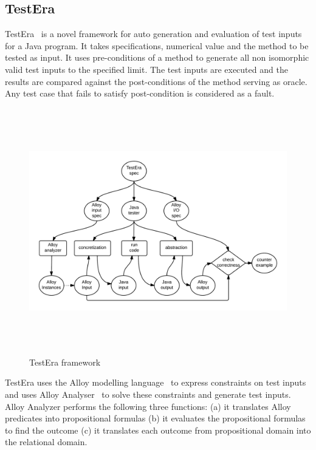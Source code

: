 \subsection{TestEra}
TestEra~\cite{marinov2001testera} is a novel framework for auto generation and evaluation of test inputs for a Java program. It takes specifications, numerical value and the method to be tested as input. It uses pre-conditions of a method to generate all non isomorphic valid test inputs to the specified limit. The test inputs are executed and the results are compared against the post-conditions of the method serving as oracle. Any test case that fails to satisfy post-condition is considered as a fault. 
\bigskip
\begin{figure}[h]
	\centering
	\centerline{\includegraphics[width=15cm, height=10.7cm]{chapter2/TestEra.png}}
	\bigskip
	\caption{TestEra framework~\cite{marinov2001testera}}
	\label{fig:testera}
\end{figure}
\bigskip
TestEra uses the Alloy modelling language~\cite{jackson2001micromodularity} to express constraints on test inputs and uses Alloy Analyser~\cite{jackson2000alcoa} to solve these constraints and generate test inputs. Alloy Analyzer performs the following three functions: (a) it translates Alloy predicates into propositional formulas%
 (b) it evaluates the propositional formulas to find the outcome (c) it translates each outcome from propositional domain into the relational domain.




